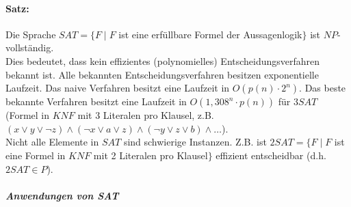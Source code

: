 \documentclass{scrreprt}
\begin{document}
\paragraph{Satz:} Die Sprache $SAT=\{F\;|\; F$ ist eine erfüllbare Formel der Aussagenlogik$\}$ ist $NP$-vollständig.\\
Dies bedeutet, dass kein effizientes (polynomielles) Entscheidungsverfahren bekannt ist. Alle bekannten Entscheidungsverfahren besitzen exponentielle Laufzeit. Das naive Verfahren besitzt eine Laufzeit in $O(p(n)\cdot 2^n)$. Das beste bekannte Verfahren besitzt eine Laufzeit in $O(1,308^n\cdot p(n))$ für $3 SAT$ (Formel in $KNF$ mit 3 Literalen pro Klausel, z.B. $(x\vee y \vee \neg z ) \wedge (\neg x \vee a \vee z) \wedge (\neg y \vee z \vee b) \wedge \dots$).\\
Nicht alle Elemente in $SAT$ sind schwierige Instanzen. Z.B. ist $2 SAT=\{F\;|\; F$ ist eine Formel in $KNF$ mit 2 Literalen pro Klausel$\}$ effizient entscheidbar (d.h. $2 SAT \in P$).\\
\subparagraph{Anwendungen von SAT} 
\end{document}
